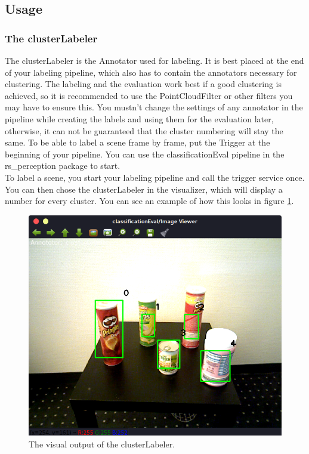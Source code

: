 \documentclass[main.tex]{subfiles}
\begin{document}
\subsection{Usage}

\subsubsection{The clusterLabeler}
The clusterLabeler is the Annotator used for labeling. It is best placed at the end of your labeling pipeline, which also has to contain the annotators necessary for clustering. The labeling and the evaluation work best if a good clustering is achieved, so it is recommended to use the PointCloudFilter or other filters you may have to ensure this. You mustn't change the settings of any annotator in the pipeline while creating the labels and using them for the evaluation later, otherwise, it can not be guaranteed that the cluster numbering will stay the same. To be able to label a scene frame by frame, put the Trigger at the beginning of your pipeline. You can use the classificationEval pipeline in the rs\_perception package to start.\\

To label a scene, you start your labeling pipeline and call the trigger service once. You can then chose the clusterLabeler in the visualizer, which will display a number for every cluster. You can see an example of how this looks in figure \ref{fig:clusterLabeler visualization}.
\begin{figure}
  \includegraphics[width=\linewidth]{pictures/perception/cluster_numbering.png}
  \caption{The visual output of the clusterLabeler.}
  \label{fig:clusterLabeler visualization}
\end{figure}
\end{document}
